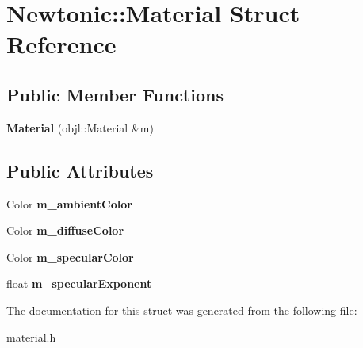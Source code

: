 \hypertarget{structNewtonic_1_1Material}{}\section{Newtonic\+::Material Struct Reference}
\label{structNewtonic_1_1Material}
\subsection*{Public Member Functions}
\begin{DoxyCompactItemize}
\item 
\mbox{\label{structNewtonic_1_1Material_a5c6ea4dd2759b07fd69144bbb59e24f4}} 
{\bfseries Material} (objl\+::\+Material \&m)
\end{DoxyCompactItemize}
\subsection*{Public Attributes}
\begin{DoxyCompactItemize}
\item 
\mbox{\label{structNewtonic_1_1Material_a3adba1ccc0742126f7ea57b43b7f97e1}} 
Color {\bfseries m\+\_\+ambient\+Color}
\item 
\mbox{\label{structNewtonic_1_1Material_ad53ff5526ec12261e8ab4066677d47d7}} 
Color {\bfseries m\+\_\+diffuse\+Color}
\item 
\mbox{\label{structNewtonic_1_1Material_a3d341250ef68a61c810552fbcc887d60}} 
Color {\bfseries m\+\_\+specular\+Color}
\item 
\mbox{\label{structNewtonic_1_1Material_af22cc203f5f994e90b31ed9148be433b}} 
float {\bfseries m\+\_\+specular\+Exponent}
\end{DoxyCompactItemize}


The documentation for this struct was generated from the following file\+:\begin{DoxyCompactItemize}
\item 
material.\+h\end{DoxyCompactItemize}
